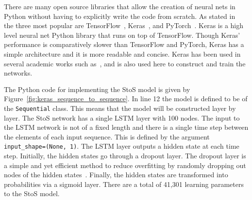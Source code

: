 There are many open source libraries that allow the creation of neural nets
in Python without having to explicitly write the code from scratch. As stated
in~\cite{Vasilev2019} the three most popular are
TensorFlow~\cite{TensorFlow2015}, Keras~\cite{Chollet2015}, and
PyTorch~\cite{pytorch}. Keras is a high level neural net Python library that
runs on top of TensorFlow. Though Keras' performance is comparatively slower
than TensorFlow and PyTorch, Keras has a simple architecture and it is more
readable and concise. Keras has been used in several academic works such
as~\cite{Barbastathis2019, Mei2018, Soffer2019}, and is also used here to
construct and train the networks.

The Python code for implementing the StoS model is given by
Figure~\ref{fig:keras_sequence_to_sequence}. In line 12 the model is defined to
be of the \texttt{Sequential} class. This means that the model will
be constructed layer by layer. The StoS network has a single LSTM layer with 100
nodes. The input to the LSTM network is not of a fixed length and there is a single
time step between the elements of each input sequence. This is defined by the
argument \texttt{input_shape=(None, 1)}. The LSTM layer outputs a
hidden state at each time step. Initially, the hidden states go through a
dropout layer. The dropout layer is a simple and yet efficient method to reduce
overfitting by randomly dropping out nodes of the hidden
states~\cite{Baldi2013}. Finally, the hidden states are transformed into
probabilities via a sigmoid layer. There are a total of 41,301 learning
parameters to the StoS model.

